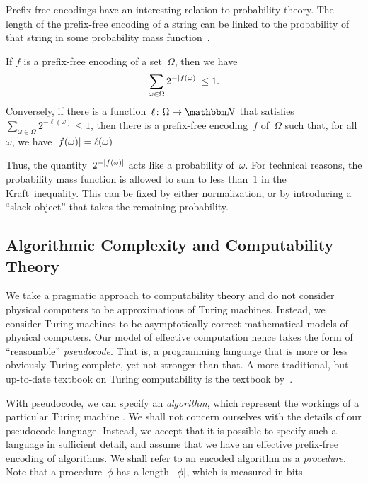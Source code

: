 Prefix-free encodings have an interesting relation to probability theory.
The length of the prefix-free encoding of a string can be linked to the probability of that string in some probability mass function~\parencite{cover2006elements,li2008introduction}.
\begin{theorem}
  If $f$ is a prefix-free encoding of a set~$\Omega$, then we have
  \begin{equation*}
    \sum_{\omega \in \Omega} 2^{-{\lvert f(\omega)\rvert}} \le 1.
  \end{equation*}
  Conversely, if there is a function~$\ell\colon \Omega \to \bbN$ that satisfies $\sum_{\omega \in \Omega} 2^{-\ell(\omega)} \le 1$, then there is a prefix-free encoding~$f$ of~$\Omega$ such that, for all $\omega$, we have ${\lvert f(\omega)\rvert} = \ell(\omega)$.
\end{theorem}
Thus, the quantity~$2^{-{\lvert f(\omega)\rvert}}$ acts like a probability of~$\omega$.
For technical reasons, the probability mass function is allowed to sum to less than~$1$ in the Kraft~inequality.
This can be fixed by either normalization, or by introducing a \enquote{slack object} that takes the remaining probability.


\subsection{Algorithmic Complexity and Computability Theory}

We take a pragmatic approach to computability theory and do not consider physical computers to be approximations of Turing machines.
Instead, we consider Turing machines to be asymptotically correct mathematical models of physical computers.
Our model of effective computation hence takes the form of \enquote{reasonable} \emph{pseudocode}.
That is, a programming language that is more or less obviously Turing complete, yet not stronger than that.
A more traditional, but up-to-date textbook on Turing computability is the textbook by~\textcite{soare2016turing}.

With pseudocode, we can specify an \emph{algorithm}, which represent the workings of a particular Turing machine \parencite[see also][]{rogers1967theory}.
We shall not concern ourselves with the details of our pseudocode-language.
Instead, we accept that it is possible to specify such a language in sufficient detail, and assume that we have an effective prefix-free encoding of algorithms.
We shall refer to an encoded algorithm as a \emph{procedure}.
Note that a procedure~$\phi$ has a length~${\lvert\phi\rvert}$, which is measured in bits.

